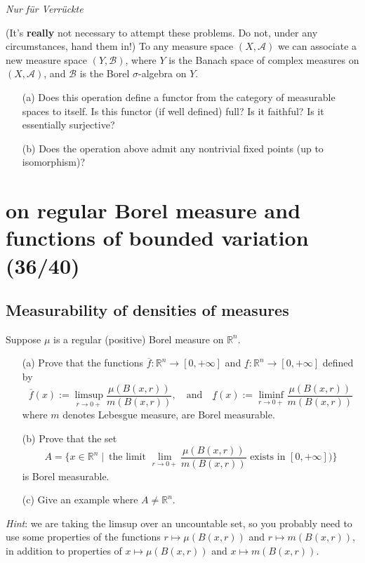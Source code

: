 \documentclass[lang=cn,11pt]{elegantbook}
\begin{document}
\vspace*{10mm}
\begin{center}
  \textit{Nur f\"ur Verr\"uckte}
\end{center}
(It's \textbf{really} not necessary to attempt these problems. Do not, under any circumstances, hand them in!)
  To any measure space $(X,\mathcal{A})$ we can associate a new measure space $(Y,\mathcal{B})$, where $Y$ is the Banach space of complex measures on $(X,\mathcal{A})$, and $\mathcal{B}$ is the Borel $\sigma$-algebra on $Y$.
  \begin{itemize}
  \item[(a)]Does this operation define a functor from the category of measurable spaces to itself. Is this functor (if well defined) full? Is it faithful? Is it essentially surjective?
  \item[(b)]Does the operation above admit any nontrivial fixed points (up to isomorphism)?
  \end{itemize}
  




\chapter{on regular Borel measure and functions of bounded variation (36/40)}

\section{Measurability of densities of measures}
  Suppose $\mu$ is a regular (positive) Borel measure on $\mathbb{R}^n$.
  \begin{itemize}
  \item[(a)]Prove that the functions $\overline f\colon\mathbb{R}^n\to[0,+\infty]$ and $\underline f\colon\mathbb{R}^n\to[0,+\infty]$ defined by    \[
      \overline f(x):=\limsup_{r\to0+}\frac{\mu(B(x,r))}{m(B(x,r))},
      \quad\text{and}\quad
      \underline f(x):=\liminf_{r\to0+}\frac{\mu(B(x,r))}{m(B(x,r))}
    \]
    where $m$ denotes Lebesgue measure, are Borel measurable.
  \item[(b)]Prove that the set \[  A=\{x\in\mathbb{R}^n\mid\ \text{the limit $\lim_{r\to0+}\frac{\mu(B(x,r))}{m(B(x,r))}$ exists in $[0,+\infty]$)}\}
    \]    is Borel measurable.
  \item[(c)] Give an example where $A\ne\mathbb{R}^n$.
  \end{itemize}
\textit{Hint}: we are taking the limsup over an uncountable set, so you probably need to use some properties of the functions $r\mapsto\mu(B(x,r))$ and $r\mapsto m(B(x,r))$, in addition to properties of  $x\mapsto\mu(B(x,r))$ and $x\mapsto m(B(x,r))$.
\end{document}
